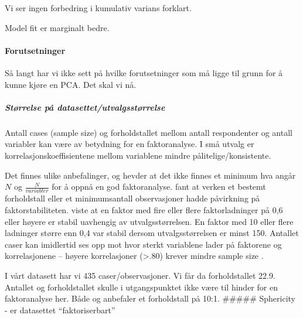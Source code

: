 \documentclass[
]{article}
\newenvironment{Shaded}{\begin{snugshade}}{\end{snugshade}}
\newcommand{\CommentTok}[1]{\textcolor[rgb]{0.56,0.35,0.01}{\textit{#1}}}
\newcommand{\NormalTok}[1]{#1}
\newcommand{\SpecialCharTok}[1]{\textcolor[rgb]{0.00,0.00,0.00}{#1}}
\begin{document}
Vi ser ingen forbedring i kumulativ varians forklart.

\begin{Shaded}
\end{Shaded}

Model fit er marginalt bedre.

\hypertarget{forutsetninger}{%
\paragraph{Forutsetninger}\label{forutsetninger}}

Så langt har vi ikke sett på hvilke forutsetninger som må ligge til grunn for å kunne kjøre en PCA. Det skal vi nå.

\hypertarget{stuxf8rrelse-puxe5-datasettetutvalgsstuxf8rrelse}{%
\subparagraph{Størrelse på datasettet/utvalgsstørrelse}\label{stuxf8rrelse-puxe5-datasettetutvalgsstuxf8rrelse}}

Antall cases (sample size) og forholdstallet mellom antall respondenter og antall variabler kan være av betydning for en faktoranalyse. I små utvalg er korrelasjonskoeffisientene mellom variablene mindre pålitelige/konsistente.

Det finnes ulike anbefalinger, og \citet{hogartyQualityFactorSolutions2005} hevder at det ikke finnes et minimum hva angår \(N\) og \(\frac{N}{variabler}\) for å oppnå en god faktoranalyse. \citet{arrindellEmpiricalTestUtility1985} fant at verken et bestemt forholdstall eller et minimumsantall observasjoner hadde påvirkning på faktorstabiliteten. \citet{guadagnoliRelationSampleSize1988} viste at en faktor med fire eller flere faktorladninger på 0,6 eller høyere er stabil uavhengig av utvalgsstørrelsen. En faktor med 10 eller flere ladninger større enn 0,4 var stabil dersom utvalgsstørrelsen er minst 150. Antallet caser kan imidlertid ses opp mot hvor sterkt variablene lader på faktorene \citep{tabachnikUsingMultivariateStatistics2007} og korrelasjonene \citep{maccallumSampleSizeFactor1999} -- høyere korrelasjoner (\textgreater.80) krever mindre sample size \citep{guadagnoliRelationSampleSize1988}.

I vårt datasett har vi 435 caser/observasjoner. Vi får da forholdstallet 22.9. Antallet og forholdstallet skulle i utgangspunktet ikke være til hinder for en faktoranalyse her. Både \citet{hairjr.MultivariateDataAnalysis2010} og \citet{nunallyPsychometricTheory1978} anbefaler et forholdstall på 10:1.
\#\#\#\#\# Sphericity - er datasettet ``faktoriserbart''
\end{document}
